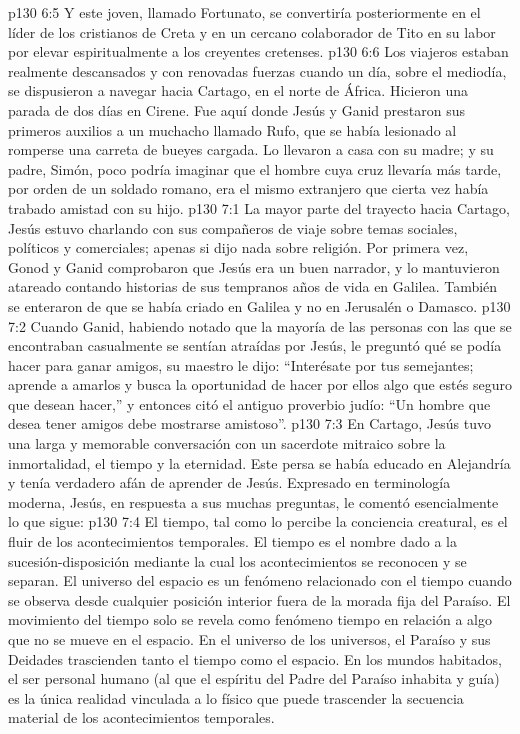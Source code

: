 \vs p130 6:5 Y este joven, llamado Fortunato, se convertiría posteriormente en el líder de los cristianos de Creta y en un cercano colaborador de Tito en su labor por elevar espiritualmente a los creyentes cretenses.
\vs p130 6:6 \pc Los viajeros estaban realmente descansados y con renovadas fuerzas cuando un día, sobre el mediodía, se dispusieron a navegar hacia Cartago, en el norte de África. Hicieron una parada de dos días en Cirene. Fue aquí donde Jesús y Ganid prestaron sus primeros auxilios a un muchacho llamado Rufo, que se había lesionado al romperse una carreta de bueyes cargada. Lo llevaron a casa con su madre; y su padre, Simón, poco podría imaginar que el hombre cuya cruz llevaría más tarde, por orden de un soldado romano, era el mismo extranjero que cierta vez había trabado amistad con su hijo.
\vs p130 7:1 La mayor parte del trayecto hacia Cartago, Jesús estuvo charlando con sus compañeros de viaje sobre temas sociales, políticos y comerciales; apenas si dijo nada sobre religión. Por primera vez, Gonod y Ganid comprobaron que Jesús era un buen narrador, y lo mantuvieron atareado contando historias de sus tempranos años de vida en Galilea. También se enteraron de que se había criado en Galilea y no en Jerusalén o Damasco.
\vs p130 7:2 Cuando Ganid, habiendo notado que la mayoría de las personas con las que se encontraban casualmente se sentían atraídas por Jesús, le preguntó qué se podía hacer para ganar amigos, su maestro le dijo: “Interésate por tus semejantes; aprende a amarlos y busca la oportunidad de hacer por ellos algo que estés seguro que desean hacer,” y entonces citó el antiguo proverbio judío: “Un hombre que desea tener amigos debe mostrarse amistoso”.
\vs p130 7:3 En Cartago, Jesús tuvo una larga y memorable conversación con un sacerdote mitraico sobre la inmortalidad, el tiempo y la eternidad. Este persa se había educado en Alejandría y tenía verdadero afán de aprender de Jesús. Expresado en terminología moderna, Jesús, en respuesta a sus muchas preguntas, le comentó esencialmente lo que sigue:
\vs p130 7:4 \pc El tiempo, tal como lo percibe la conciencia creatural, es el fluir de los acontecimientos temporales. El tiempo es el nombre dado a la sucesión\hyp{}disposición mediante la cual los acontecimientos se reconocen y se separan. El universo del espacio es un fenómeno relacionado con el tiempo cuando se observa desde cualquier posición interior fuera de la morada fija del Paraíso. El movimiento del tiempo solo se revela como fenómeno tiempo en relación a algo que no se mueve en el espacio. En el universo de los universos, el Paraíso y sus Deidades trascienden tanto el tiempo como el espacio. En los mundos habitados, el ser personal humano (al que el espíritu del Padre del Paraíso inhabita y guía) es la única realidad vinculada a lo físico que puede trascender la secuencia material de los acontecimientos temporales.
